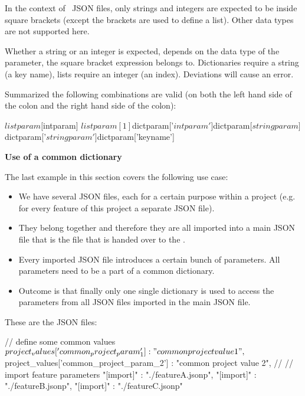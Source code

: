 In the context of \pkg\ JSON files, only strings and integers are expected to be inside square brackets (except the brackets are used to define a list).
Other data types are not supported here.

Whether a string or an integer is expected, depends on the data type of the parameter, the square bracket expression belongs to. Dictionaries require a string (a key name), lists require an integer (an index).
Deviations will cause an error.

Summarized the following combinations are valid (on both the left hand side of the colon and the right hand side of the colon):

\begin{pythoncode}
${listparam}[${intparam}]
${listparam}[1]
${dictparam}['${intparam}']
${dictparam}[${stringparam}]
${dictparam}['${stringparam}']
${dictparam}['keyname']
\end{pythoncode}

\vspace{2ex}

\textbf{Use of a common dictionary}

The last example in this section covers the following use case:

\begin{itemize}
   \item We have several JSON files, each for a certain purpose within a project (e.g. for every feature of this project a separate JSON file).
   \item They belong together and therefore they are all imported into a main JSON file that is the file that is handed over to the \pkg.
   \item Every imported JSON file introduces a certain bunch of parameters. All parameters need to be a part of a common dictionary.
   \item Outcome is that finally only one single dictionary is used to access the parameters from all JSON files imported in the main JSON file.
\end{itemize}


\newpage

These are the JSON files:

\vspace{2ex}

\textbullet {}

\begin{pythoncode}
{
   // define some common values
   ${project_values}['common_project_param_1'] : "common project value 1",
   ${project_values}['common_project_param_2'] : "common project value 2",
   //
   // import feature parameters
   "[import]" : "./featureA.jsonp",
   "[import]" : "./featureB.jsonp",
   "[import]" : "./featureC.jsonp"
}
\end{pythoncode}

